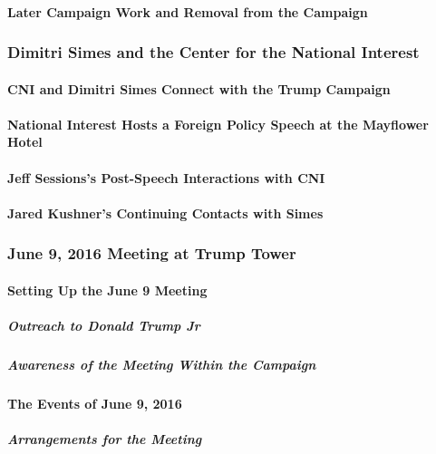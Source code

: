 \paragraph{Later Campaign Work and Removal from the Campaign}

\subsubsection{Dimitri Simes and the Center for the National Interest}

\paragraph{CNI and Dimitri Simes Connect with the Trump Campaign}

\paragraph{National Interest Hosts a Foreign Policy Speech at the Mayflower Hotel}

\paragraph{Jeff Sessions's Post-Speech Interactions with CNI}

\paragraph{Jared Kushner's Continuing Contacts with Simes}

\subsubsection{June 9, 2016 Meeting at Trump Tower}

\paragraph{Setting Up the June 9 Meeting}

\subparagraph{Outreach to Donald Trump Jr}

\subparagraph{Awareness of the Meeting Within the Campaign}

\paragraph{The Events of June 9, 2016}

\subparagraph{Arrangements for the Meeting}

